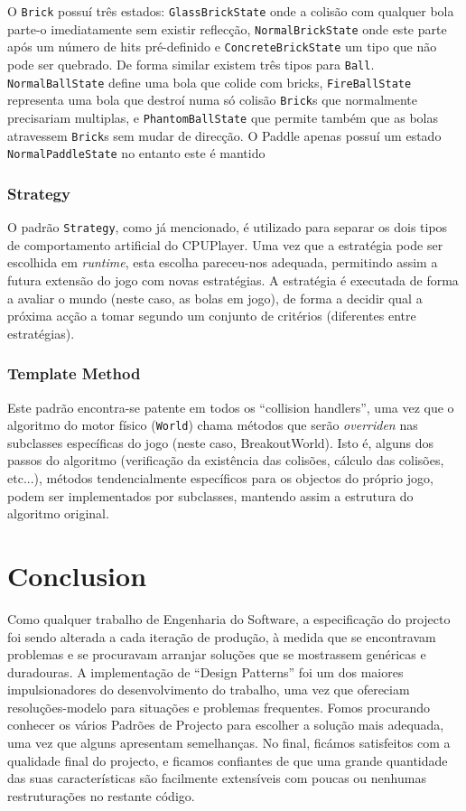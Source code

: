 \documentclass[a4paper]{article}
\begin{document}
O \texttt{Brick} possuí três estados: \texttt{GlassBrickState} onde a colisão com qualquer bola parte-o imediatamente sem existir reflecção, \texttt{NormalBrickState} onde este parte após um número de hits pré-definido e \texttt{ConcreteBrickState} um tipo que não pode ser quebrado. De forma similar existem três tipos para \texttt{Ball}. \texttt{NormalBallState} define uma bola que colide com bricks, \texttt{FireBallState} representa uma bola que destroí numa só colisão \texttt{Brick}s que normalmente precisariam multiplas, e \texttt{PhantomBallState} que permite também que as bolas atravessem \texttt{Brick}s sem mudar de direcção. O Paddle apenas possuí um estado \texttt{NormalPaddleState} no entanto este é mantido 

\subsubsection{Strategy}
\noindent O padrão \texttt{Strategy}, como já mencionado, é utilizado para separar os dois tipos de comportamento artificial do CPUPlayer. Uma vez que a estratégia pode ser escolhida em \textit{runtime}, esta escolha pareceu-nos adequada, permitindo assim a futura extensão do jogo com novas estratégias. A estratégia é executada de forma a avaliar o mundo (neste caso, as bolas em jogo), de forma a decidir qual a próxima acção a tomar segundo um conjunto de critérios (diferentes entre estratégias).

\subsubsection{Template Method}
\noindent Este padrão encontra-se patente em todos os ``collision handlers'', uma vez que o algoritmo do motor físico (\texttt{World}) chama métodos que serão \textit{overriden} nas subclasses específicas do jogo (neste caso, BreakoutWorld). Isto é, alguns dos passos do algoritmo (verificação da existência das colisões, cálculo das colisões, etc...), métodos tendencialmente específicos para os objectos do próprio jogo, podem ser implementados por subclasses, mantendo assim a estrutura do algoritmo original.


\section{Conclusion}
\noindent Como qualquer trabalho de Engenharia do Software, a especificação do projecto foi sendo alterada a cada iteração de produção, à medida que se encontravam problemas e se procuravam arranjar soluções que se mostrassem genéricas e duradouras. A implementação de ``Design Patterns'' foi um dos maiores impulsionadores do desenvolvimento do trabalho, uma vez que ofereciam resoluções-modelo para situações e problemas frequentes. Fomos procurando conhecer os vários Padrões de Projecto para escolher a solução mais adequada, uma vez que alguns apresentam semelhanças. No final, ficámos satisfeitos com a qualidade final do projecto, e ficamos confiantes de que uma grande quantidade das suas características são facilmente extensíveis com poucas ou nenhumas restruturações no restante código.
\end{document}
